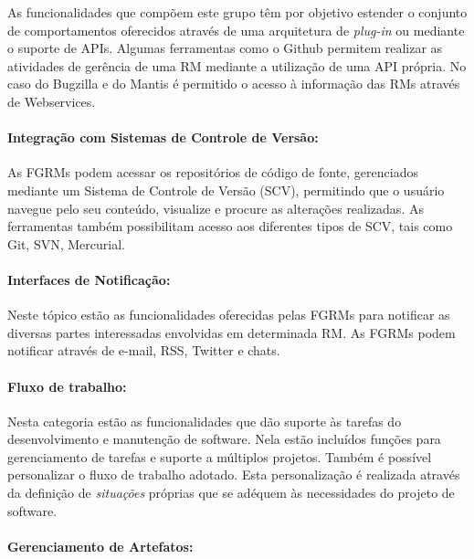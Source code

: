 As funcionalidades que compõem este grupo têm por objetivo estender o conjunto
de comportamentos oferecidos através de uma arquitetura de \textit{plug-in} ou
mediante o suporte de APIs. Algumas ferramentas como o Github permitem realizar
as atividades de gerência de uma RM mediante a utilização de uma API própria.
No caso do Bugzilla e do Mantis é permitido o acesso à informação das RMs
através de Webservices.

\paragraph{Integração com Sistemas de Controle de Versão:}
\label{par:integração_com_sistemas_de_controle_de_versão}

As FGRMs podem acessar os repositórios de código de fonte, gerenciados mediante
um Sistema de Controle de Versão (SCV), permitindo que o usuário navegue pelo
seu conteúdo, visualize e procure as alterações realizadas. As ferramentas
também possibilitam acesso aos diferentes tipos de SCV, tais como Git, SVN,
Mercurial.

\paragraph{Interfaces de Notificação:}
\label{par:interfaces_de_notificação}

Neste tópico estão as funcionalidades oferecidas pelas FGRMs para notificar as
diversas partes interessadas envolvidas em determinada RM\@. As FGRMs podem
notificar através de e-mail, RSS, Twitter e chats.

\paragraph{Fluxo de trabalho:}
\label{par:fluxo_de_trabalho}

Nesta categoria estão as funcionalidades que dão suporte às tarefas do
desenvolvimento e manutenção de software. Nela estão incluídos funções para
gerenciamento de tarefas e suporte a múltiplos projetos. Também é possível
personalizar o fluxo de trabalho adotado. Esta personalização é realizada
através da definição de \textit{situações} próprias que se adéquem às
necessidades do projeto de software.

\paragraph{Gerenciamento de Artefatos:}
\label{par:gerenciamento_de_artefatos}

